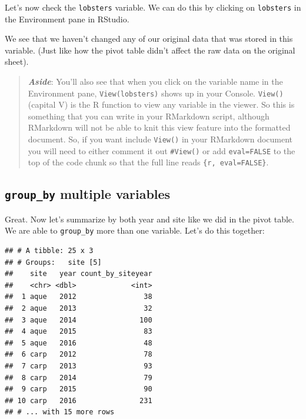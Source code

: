 \documentclass[]{book}
\newenvironment{Shaded}{\begin{snugshade}}{\end{snugshade}}
\newcommand{\DataTypeTok}[1]{\textcolor[rgb]{0.13,0.29,0.53}{#1}}
\newcommand{\KeywordTok}[1]{\textcolor[rgb]{0.13,0.29,0.53}{\textbf{#1}}}
\newcommand{\NormalTok}[1]{#1}
\newcommand{\OperatorTok}[1]{\textcolor[rgb]{0.81,0.36,0.00}{\textbf{#1}}}
\newcommand{\StringTok}[1]{\textcolor[rgb]{0.31,0.60,0.02}{#1}}
\begin{document}
Let's now check the \texttt{lobsters} variable. We can do this by clicking on \texttt{lobsters} in the Environment pane in RStudio.

We see that we haven't changed any of our original data that was stored in this variable. (Just like how the pivot table didn't affect the raw data on the original sheet).

\begin{quote}
\textbf{\emph{Aside}}: You'll also see that when you click on the variable name in the Environment pane, \texttt{View(lobsters)} shows up in your Console. \texttt{View()} (capital V) is the R function to view any variable in the viewer. So this is something that you can write in your RMarkdown script, although RMarkdown will not be able to knit this view feature into the formatted document. So, if you want include \texttt{View()} in your RMarkdown document you will need to either comment it out \texttt{\#View()} or add \texttt{eval=FALSE} to the top of the code chunk so that the full line reads \texttt{\{r,\ eval=FALSE\}}.
\end{quote}

\hypertarget{group_by-multiple-variables}{%
\subsection{\texorpdfstring{\texttt{group\_by} multiple variables}{group\_by multiple variables}}\label{group_by-multiple-variables}}

Great. Now let's summarize by both year and site like we did in the pivot table. We are able to \texttt{group\_by} more than one variable. Let's do this together:

\begin{Shaded}
\end{Shaded}

\begin{verbatim}
## # A tibble: 25 x 3
## # Groups:   site [5]
##    site   year count_by_siteyear
##    <chr> <dbl>             <int>
##  1 aque   2012                38
##  2 aque   2013                32
##  3 aque   2014               100
##  4 aque   2015                83
##  5 aque   2016                48
##  6 carp   2012                78
##  7 carp   2013                93
##  8 carp   2014                79
##  9 carp   2015                90
## 10 carp   2016               231
## # ... with 15 more rows
\end{verbatim}
\end{document}
